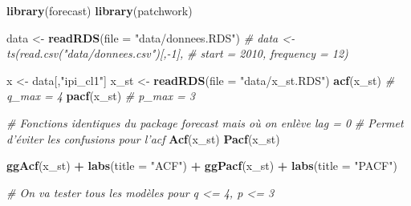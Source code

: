 \documentclass[french]{article}
\newenvironment{Shaded}{\begin{snugshade}}{\end{snugshade}}
\newcommand{\CommentTok}[1]{\textcolor[rgb]{0.56,0.35,0.01}{\textit{#1}}}
\newcommand{\DataTypeTok}[1]{\textcolor[rgb]{0.13,0.29,0.53}{#1}}
\newcommand{\KeywordTok}[1]{\textcolor[rgb]{0.13,0.29,0.53}{\textbf{#1}}}
\newcommand{\NormalTok}[1]{#1}
\newcommand{\OperatorTok}[1]{\textcolor[rgb]{0.81,0.36,0.00}{\textbf{#1}}}
\newcommand{\StringTok}[1]{\textcolor[rgb]{0.31,0.60,0.02}{#1}}
\begin{document}
\begin{Shaded}
\begin{Highlighting}[]
\KeywordTok{library}\NormalTok{(forecast)}
\KeywordTok{library}\NormalTok{(patchwork)}

\NormalTok{data <-}\StringTok{ }\KeywordTok{readRDS}\NormalTok{(}\DataTypeTok{file =} \StringTok{"data/donnees.RDS"}\NormalTok{)}
\CommentTok{# data <- ts(read.csv("data/donnees.csv")[,-1],}
\CommentTok{#          start = 2010, frequency = 12)}

\NormalTok{x <-}\StringTok{ }\NormalTok{data[,}\StringTok{"ipi_cl1"}\NormalTok{]}
\NormalTok{x_st <-}\StringTok{ }\KeywordTok{readRDS}\NormalTok{(}\DataTypeTok{file =} \StringTok{"data/x_st.RDS"}\NormalTok{)}
\KeywordTok{acf}\NormalTok{(x_st) }\CommentTok{# q_max = 4}
\KeywordTok{pacf}\NormalTok{(x_st) }\CommentTok{# p_max = 3}

\CommentTok{# Fonctions identiques du package forecast mais où on enlève lag = 0}
\CommentTok{# Permet d'éviter les confusions pour l'acf}
\KeywordTok{Acf}\NormalTok{(x_st)}
\KeywordTok{Pacf}\NormalTok{(x_st)}

\KeywordTok{ggAcf}\NormalTok{(x_st) }\OperatorTok{+}\StringTok{ }\KeywordTok{labs}\NormalTok{(}\DataTypeTok{title =} \StringTok{"ACF"}\NormalTok{) }\OperatorTok{+}
\StringTok{    }\KeywordTok{ggPacf}\NormalTok{(x_st) }\OperatorTok{+}\StringTok{ }\KeywordTok{labs}\NormalTok{(}\DataTypeTok{title =} \StringTok{"PACF"}\NormalTok{)}

\CommentTok{# On va tester tous les modèles pour q <= 4, p <= 3}


\end{Highlighting}
\end{Shaded}
\end{document}
